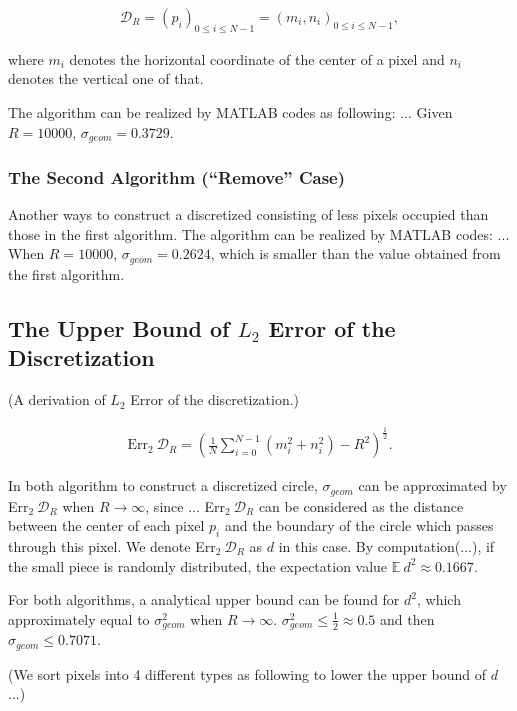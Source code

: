 \documentclass[letterpaper]{article}
\numberwithin{equation}{section} %
\numberwithin{figure}{section} %
\numberwithin{table}{section} %
\begin{document}
\begin{align} 
\mathcal{D}_R=(p_{i})_{0 \leq i \leq N-1} = (m_i, n_i)_{0 \leq i \leq N-1},
\end{align}

where $m_i$ denotes the horizontal coordinate of the center of a pixel and $n_i$ denotes the vertical one of that.

The algorithm can be realized by MATLAB codes as following: ... Given $R=10000$, $\sigma_{geom}=0.3729$.

	
\subsubsection{The Second Algorithm (\enquote{Remove} Case)}

Another ways to construct a discretized consisting of less pixels occupied than those in the first algorithm. The algorithm can be realized by MATLAB codes: ... When $R=10000$, $\sigma_{geom}=0.2624$, which is smaller than the value obtained from the first algorithm.

\subsection{The Upper Bound of $L_{2}$ Error of the Discretization}

(A derivation of $L_{2}$ Error of the discretization.)

\begin{align} 
\text{Err}_2 \ \mathcal{D}_R=(\frac{1}{N} \sum_{i=0}^{N-1} (m_i^2+n_i^2)-R^2)^{\frac{1}{2}}.
\end{align}


In both algorithm to construct a discretized circle, $\sigma_{geom}$ can be approximated by Err$_2 \ \mathcal{D}_R$ when $R \rightarrow \infty$, since ... Err$_2 \ \mathcal{D}_R$ can be considered as the distance between the center of each pixel $p_i$ and the boundary of the circle which passes through this pixel. We denote Err$_2 \ \mathcal{D}_R$ as $d$ in this case. By computation(...), if the small piece is randomly distributed, the expectation value $\mathbb{E}\ d^2 \approx 0.1667$. 

For both algorithms, a analytical upper bound can be found for $d^2$, which approximately equal to $\sigma_{geom}^2$ when $R \rightarrow \infty$. $\sigma_{geom}^2 \leq \frac{1}{2} \approx 0.5$ and then $\sigma_{geom} \leq 0.7071$.

(We sort pixels into 4 different types as following to lower the upper bound of $d$ ...)
\end{document}
